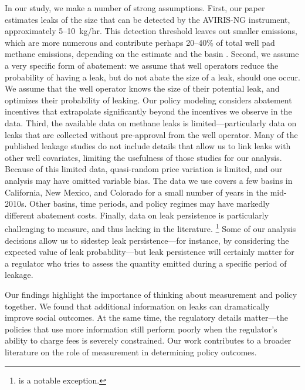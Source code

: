 In our study, we make a number of strong assumptions.
First, our paper estimates leaks of the size that can be detected by the \gls{AVIRIS-NG} instrument, approximately 5--10~kg/hr.
This detection threshold leaves out smaller emissions, which are more numerous and contribute perhaps 20--40\% of total well pad methane emissions, depending on the estimate and the basin \parencite{Sherwin/etal:2023}.
Second, we assume a very specific form of abatement: we assume that well operators reduce the probability of having a leak, but do not abate the size of a leak, should one occur.
We assume that the well operator knows the size of their potential leak, and optimizes their probability of leaking.
Our policy modeling considers abatement incentives that extrapolate significantly beyond the incentives we observe in the data.
Third, the available data on methane leaks is limited---particularly data on leaks that are collected without pre-approval from the well operator.
Many of the published leakage studies do not include details that allow us to link leaks with other well covariates, limiting the usefulness of those studies for our analysis.
Because of this limited data, quasi-random price variation is limited, and our analysis may have omitted variable bias.
The data we use covers a few basins in California, New Mexico, and Colorado for a small number of years in the mid-2010s.
Other basins, time periods, and policy regimes may have markedly different abatement costs.
Finally, data on leak persistence is particularly challenging to measure, and thus lacking in the literature.%
\footnote{\textcite{Wang/Daniels/Hammerling/Harrison/Burmaster/George/Ravikumar:2022} is a notable exception.}
Some of our analysis decisions allow us to sidestep leak persistence---for instance, by considering the expected value of leak probability---but leak persistence will certainly matter for a regulator who tries to assess the quantity emitted during a specific period of leakage.


Our findings highlight the importance of thinking about measurement and policy together.
We found that additional information on leaks can dramatically improve social outcomes.
At the same time, the regulatory details matter---the policies that use more information still perform poorly when the regulator's ability to charge fees is severely constrained.
Our work contributes to a broader literature on the role of measurement in determining policy outcomes.


\iftoggle{endfloat}{}{\FloatBarrier} %


\clearpage
\begin{RaggedRight}
\twocolumn
{\singlespacing
\printbibliography[notkeyword={code}]
}
\end{RaggedRight}

